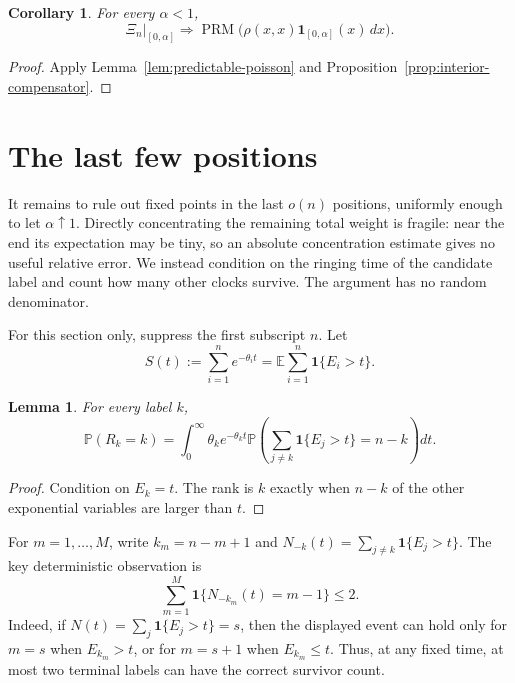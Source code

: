 \documentclass[11pt]{article}
\newtheorem{lemma}[theorem]{Lemma}
\newtheorem{corollary}[theorem]{Corollary}
\theoremstyle{remark}
\theoremstyle{plain}
\newcommand{\E}{\mathbb E}
\newcommand{\Pp}{\mathbb P}
\newcommand{\one}{\mathbf 1}
\begin{document}
\begin{corollary}\label{cor:interior-poisson}
For every $\alpha<1$,
\begin{equation}\label{eq:interior-poisson}
 \Xi_n|_{[0,\alpha]}\Longrightarrow
 \operatorname{PRM}\bigl(\rho(x,x)\one_{[0,\alpha]}(x)\,dx\bigr).
\end{equation}
\end{corollary}

\begin{proof}
Apply Lemma~\ref{lem:predictable-poisson} and
Proposition~\ref{prop:interior-compensator}.
\end{proof}

\section{The last few positions}\label{sec:endpoint}

It remains to rule out fixed points in the last $o(n)$ positions, uniformly
enough to let $\alpha\uparrow1$.  Directly concentrating the remaining total
weight is fragile: near the end its expectation may be tiny, so an absolute
concentration estimate gives no useful relative error.  We instead condition
on the ringing time of the candidate label and count how many other clocks
survive.  The argument has no random denominator.

For this section only, suppress the first subscript $n$.  Let
\begin{equation}\label{eq:mean-survivors}
 S(t):=\sum_{i=1}^ne^{-\theta_i t}=\E\sum_{i=1}^n\one\{E_i>t\}.
\end{equation}

\begin{lemma}\label{lem:rank-integral}
For every label $k$,
\begin{equation}\label{eq:rank-integral}
 \Pp(R_k=k)=
 \int_0^\infty \theta_k e^{-\theta_k t}
 \Pp\left(\sum_{j\ne k}\one\{E_j>t\}=n-k\right)dt.
\end{equation}
\end{lemma}

\begin{proof}
Condition on $E_k=t$.  The rank is $k$ exactly when $n-k$ of the other
exponential variables are larger than $t$.
\end{proof}

For $m=1,\ldots,M$, write $k_m=n-m+1$ and
$N_{-k}(t)=\sum_{j\ne k}\one\{E_j>t\}$.  The key deterministic observation is
\begin{equation}\label{eq:two-candidate}
 \sum_{m=1}^M\one\{N_{-k_m}(t)=m-1\}\le2.
\end{equation}
Indeed, if $N(t)=\sum_j\one\{E_j>t\}=s$, then the displayed event can hold only
for $m=s$ when $E_{k_m}>t$, or for $m=s+1$ when $E_{k_m}\le t$.  Thus, at any
fixed time, at most two terminal labels can have the correct survivor count.
\end{document}
